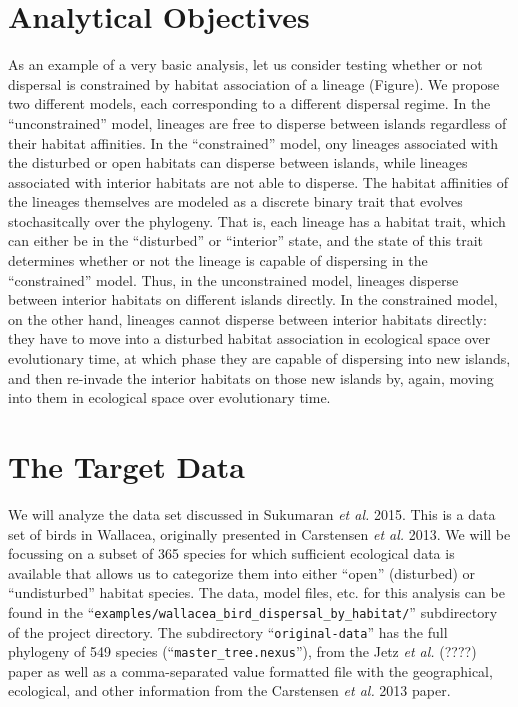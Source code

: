\documentclass[11pt,openany]{memoir} %
\begin{document}
\section{Analytical Objectives}

As an example of a very basic analysis, let us consider testing whether or not dispersal is constrained by habitat association of a lineage (Figure).
We propose two different models, each corresponding to a different dispersal regime.
In the ``unconstrained'' model, lineages are free to disperse between islands regardless of their habitat affinities.
In the ``constrained'' model, ony lineages associated with the disturbed or open habitats can disperse between islands, while lineages associated with interior habitats are not able to disperse.
The habitat affinities of the lineages themselves are modeled as a discrete binary trait that evolves stochasitcally over the phylogeny.
That is, each lineage has a habitat trait, which can either be in the ``disturbed'' or ``interior'' state, and the state of this trait determines whether or not the lineage is capable of dispersing in the ``constrained'' model.
Thus, in the unconstrained model, lineages disperse between interior habitats on different islands directly.
In the constrained model, on the other hand, lineages cannot disperse between interior habitats directly: they have to move into a disturbed habitat association in ecological space over evolutionary time, at which phase they are capable of dispersing into new islands, and then re-invade the interior habitats on those new islands by, again, moving into them in ecological space over evolutionary time.

\section{The Target Data}

We will analyze the data set discussed in Sukumaran \textit{et al.} 2015.
This is a data set of birds in Wallacea, originally presented in Carstensen \textit{et al.} 2013.
We will be focussing on a subset of 365 species for which sufficient ecological data is available that allows us to categorize them into either ``open'' (disturbed) or ``undisturbed'' habitat species.
The data, model files, etc. for this analysis can be found in the ``\texttt{examples/wallacea\_bird\_dispersal\_by\_habitat/}'' subdirectory of the project directory.
The subdirectory ``\texttt{original-data}'' has the full phylogeny of 549 species (``\texttt{master\_tree.nexus}''), from the Jetz \textit{et al.} (????) paper as well as a comma-separated value formatted file with the geographical, ecological, and other information from the Carstensen \textit{et al.} 2013 paper.
\end{document}
